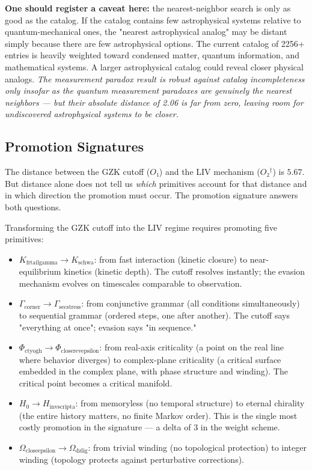 \documentclass[12pt,a4paper]{article}
\begin{document}
\textbf{One should register a caveat here:} the nearest-neighbor search is only as good as the catalog. If the catalog contains few astrophysical systems relative to quantum-mechanical ones, the "nearest astrophysical analog" may be distant simply because there are few astrophysical options. The current catalog of 2256+ entries is heavily weighted toward condensed matter, quantum information, and mathematical systems. A larger astrophysical catalog could reveal closer physical analogs. \emph{The measurement paradox result is robust against catalog incompleteness only insofar as the quantum measurement paradoxes are genuinely the nearest neighbors --- but their absolute distance of 2.06 is far from zero, leaving room for undiscovered astrophysical systems to be closer.}

\subsection{Promotion Signatures}

The distance between the GZK cutoff ($O₁$) and the LIV mechanism ($O₂^\dagger$) is $5.67$. But distance alone does not tell us \emph{which} primitives account for that distance and in which direction the promotion must occur. The promotion signature answers both questions.

Transforming the GZK cutoff into the LIV regime requires promoting five primitives:

\begin{itemize}
    \item $K_{\text{frtailgamma}} \to K_{\text{schwa}}$: from fast interaction (kinetic closure) to near-equilibrium kinetics (kinetic depth). The cutoff resolves instantly; the evasion mechanism evolves on timescales comparable to observation.
    \item $\Gamma_{\text{corner}} \to \Gamma_{\text{secstress}}$: from conjunctive grammar (all conditions simultaneously) to sequential grammar (ordered steps, one after another). The cutoff says "everything at once"; evasion says "in sequence."
    \item $\Phi_{\text{ctyogh}} \to \Phi_{\text{closerevepsilon}}$: from real-axis criticality (a point on the real line where behavior diverges) to complex-plane criticality (a critical surface embedded in the complex plane, with phase structure and winding). The critical point becomes a critical manifold.
    \item $H_0 \to H_{\text{invscripta}}$: from memoryless (no temporal structure) to eternal chirality (the entire history matters, no finite Markov order). This is the single most costly promotion in the signature --- a delta of 3 in the weight scheme.
    \item $\Omega_{\text{closeepsilon}} \to \Omega_{\text{dzlig}}$: from trivial winding (no topological protection) to integer winding (topology protects against perturbative corrections).
\end{itemize}
\end{document}
